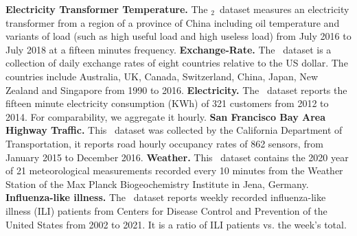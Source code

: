 \textbf{Electricity Transformer Temperature.} The \ETTm$_{2}$\ dataset measures an electricity transformer from a region of a province of China including oil temperature and variants of load (such as high useful load and high useless load) from July 2016 to July 2018 at a fifteen minutes frequency. %
\textbf{Exchange-Rate.} The \Exchange\ dataset is a collection of daily exchange rates of eight countries relative to the US dollar. The countries include Australia, UK, Canada, Switzerland, China, Japan, New Zealand and Singapore from 1990 to 2016. %
\textbf{Electricity.} The \Electricity\ dataset reports the fifteen minute electricity consumption (KWh) of 321 customers from 2012 to 2014. For comparability, we aggregate it hourly. %
\textbf{San Francisco Bay Area Highway Traffic.} This \TrafficL\ dataset was collected by the California Department of Transportation, it reports road hourly occupancy rates of 862 sensors, from January 2015 to December 2016. %
\textbf{Weather.} This \Weather\ dataset contains the 2020 year of 21 meteorological measurements recorded every 10 minutes from the Weather Station of the Max Planck Biogeochemistry Institute in Jena, Germany. %
\textbf{Influenza-like illness.} The \ILI\ dataset reports weekly recorded influenza-like illness (ILI) patients from Centers for Disease Control and Prevention of the United States from 2002 to 2021. It is a ratio of ILI patients vs. the week's total. %

